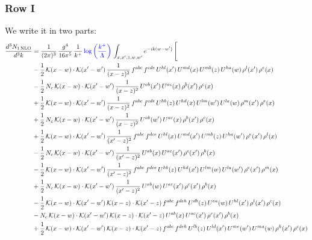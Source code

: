 \documentclass[9pt]{article}
\numberwithin{equation}{section}
\begin{document}
\subsubsection{Row I}
We write it in two parts: 
\begin{align}
\frac{d^{3}N_{1\,\mathrm{NLO}}}{d^{3}k} & = \frac{1}{(2\pi)^{3}}\,\frac{g^{4}}{16\pi^{5}}\,\frac{1}{k^{+}}\,{\color{blue}\log{\left(\frac{k^{+}}{\Lambda}\right)}}\,\int_{x,x',z,w,w'}e^{-ik(w-w')}\,\Bigg[\notag\\ & -\frac{1}{2}\,\mathcal{K}(x-w)\cdot\mathcal{K}(x'-w')\,\frac{1}{(x-z)^{2}}\,f^{abc}\,f^{cde}\,U^{hl}(x')\,U^{md}(x)\,U^{mb}(z)\,U^{ha}(w)\,\rho^{l}(x')\,\rho^{e}(x)\notag\\
& -\frac{1}{2}\,N_{c}\,\mathcal{K}(x-w)\cdot\mathcal{K}(x'-w')\,\frac{1}{(x-z)^{2}}\,U^{ab}(x')\,U^{ac}(x)\,\rho^{b}(x')\,\rho^{c}(x)\notag\\
& +\frac{1}{2}\,\mathcal{K}(x-w)\cdot\mathcal{K}(x'-w')\,\frac{1}{(x-z)^{2}}\,f^{abc}\,f^{cde}\,U^{hb}(z)\,U^{hd}(x)\,U^{lm}(w')\,U^{la}(w)\,\rho^{m}(x')\,\rho^{e}(x)\notag\\
& +\frac{1}{2}\,N_{c}\,\mathcal{K}(x-w)\cdot\mathcal{K}(x'-w')\,\frac{1}{(x-z)^{2}}\,U^{ab}(w')\,U^{ac}(x)\,\rho^{b}(x')\,\rho^{c}(x)\notag\\
& +\frac{1}{2}\,\mathcal{K}(x-w)\cdot\mathcal{K}(x'-w')\,\frac{1}{(x'-z)^{2}}\,f^{abc}\,f^{dce}\,U^{hl}(x)\,U^{md}(x')\,U^{mb}(z)\,U^{ha}(w')\,\rho^{e}(x')\,\rho^{l}(x)\notag\\
& -\frac{1}{2}\,N_{c}\,\mathcal{K}(x-w)\cdot\mathcal{K}(x'-w')\,\frac{1}{(x'-z)^{2}}\,U^{ab}(x)\,U^{ac}(x')\,\rho^{c}(x')\,\rho^{b}(x)\notag\\
& -\frac{1}{2}\,\mathcal{K}(x-w)\cdot\mathcal{K}(x'-w')\,\frac{1}{(x'-z)^{2}}\,f^{abc}\,f^{dce}\,U^{hb}(z)\,U^{hd}(x')\,U^{lm}(w)\,U^{la}(w')\,\rho^{e}(x')\,\rho^{m}(x)\notag\\
& +\frac{1}{2}\,N_{c}\,\mathcal{K}(x-w)\cdot\mathcal{K}(x'-w')\,\frac{1}{(x'-z)^{2}}\,U^{ab}(w)\,U^{ac}(x')\,\rho^{c}(x')\,\rho^{b}(x)\notag\\
& -\frac{1}{2}\,\mathcal{K}(x-w)\cdot\mathcal{K}(x'-w')\,\mathcal{K}(x-z)\cdot\mathcal{K}(x'-z)\,f^{abc}\,f^{deh}\,U^{db}(z)\,U^{ea}(w)\,U^{hl}(x')\,\rho^{l}(x')\,\rho^{c}(x)\notag\\
& -N_{c}\,\mathcal{K}(x-w)\cdot\mathcal{K}(x'-w')\,\mathcal{K}(x-z)\cdot\mathcal{K}(x'-z)\,U^{ab}(x)\,U^{ac}(x')\,\rho^{c}(x')\,\rho^{b}(x)\notag\\
& +\frac{1}{2}\,\mathcal{K}(x-w)\cdot\mathcal{K}(x'-w')\,\mathcal{K}(x-z)\cdot\mathcal{K}(x'-z)\,f^{abc}\,f^{deh}\,U^{lb}(z)\,U^{ld}(x')\,U^{me}(w')\,U^{ma}(w)\,\rho^{h}(x')\,\rho^{c}(x)\notag\\

\end{align}
\end{document}
